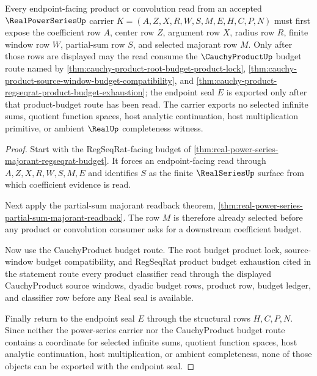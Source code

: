 \begin{theorem}
\label{thm:real-power-series-cauchy-product-coefficient-budget}
Every endpoint-facing product or convolution read from an accepted $\RealPowerSeriesUp$ carrier $K=(A,Z,X,R,W,S,M,E,H,C,P,N)$ must first expose the coefficient row $A$, center row $Z$, argument row $X$, radius row $R$, finite window row $W$, partial-sum row $S$, and selected majorant row $M$. Only after those rows are displayed may the read consume the $\CauchyProductUp$ budget route named by \autoref{thm:cauchy-product-root-budget-product-lock}, \autoref{thm:cauchy-product-source-window-budget-compatibility}, and \autoref{thm:cauchy-product-regseqrat-product-budget-exhaustion}; the endpoint seal $E$ is exported only after that product-budget route has been read. The carrier exports no selected infinite sums, quotient function spaces, host analytic continuation, host multiplication primitive, or ambient $\RealUp$ completeness witness.
\end{theorem}
\begin{proof}
Start with the RegSeqRat-facing budget of \autoref{thm:real-power-series-majorant-regseqrat-budget}. It forces an endpoint-facing read through $A,Z,X,R,W,S,M,E$ and identifies $S$ as the finite $\RealSeriesUp$ surface from which coefficient evidence is read.

Next apply the partial-sum majorant readback theorem, \autoref{thm:real-power-series-partial-sum-majorant-readback}. The row $M$ is therefore already selected before any product or convolution consumer asks for a downstream coefficient budget.

Now use the CauchyProduct budget route. The root budget product lock, source-window budget compatibility, and RegSeqRat product budget exhaustion cited in the statement route every product classifier read through the displayed CauchyProduct source windows, dyadic budget rows, product row, budget ledger, and classifier row before any Real seal is available.

Finally return to the endpoint seal $E$ through the structural rows $H,C,P,N$. Since neither the power-series carrier nor the CauchyProduct budget route contains a coordinate for selected infinite sums, quotient function spaces, host analytic continuation, host multiplication, or ambient completeness, none of those objects can be exported with the endpoint seal.
\end{proof}

